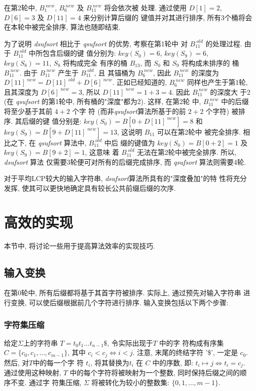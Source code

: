 \documentclass{ws-ijprai}
\begin{document}
在第2轮中, $B_1^{\;new}$, $B_6^{\;new}$ 及 $B_{11}^{\;new}$ 将会依次被
处理. 通过使用 $D[1] = 2$, $D[6] = 3$ 及 $D[11] = 4$ 来分别计算后缀的
键值并对其进行排序, 所有3个桶将会在本轮中被完全排序, 算法也随即结束.

为了说明 \emph{dsufsort} 相比于 \emph{qsufsort} 的优势, 考察在第1轮中
对 $B_{11}^{\;old}$ 的处理过程. 由于 $B_{11}^{\;old}$ 中所包含后缀的键
值分别为: $key(S_0)=6$, $key(S_9)=6$, $key(S_8) = 11$, $S_8$ 将构成完全
有序的桶 $B_{13}$, 而 $S_0$ 和 $S_9$ 将构成未排序的
桶 $B_{11}^{\;new}$. 由于 $B_{11}^{\;new}$ 产生于 $B_{11}^{\;old}$, 且
其锚桶为 $B_6^{\;new}$, 因此 $B_{11}^{\;new}$ 的深度为
$D[11]^{\;new} = D[11]^{\;old} + D[6]^{\;new}$. 正如已经知道的,
$B_6^{\;new}$ 同样也产生于第1轮, 且其深度为 $D[6]^{\;new} =
3$, 所以 $D[11]^{\;new} = 1 + 3 = 4$. 因此 $B_{11}^{\;new}$ 的深度大
于2 (在 \emph{qsufsort} 的第1轮中, 所有桶的"深度"都为2). 这样, 在第2轮
中, $B_{11}^{\;new}$ 中的后缀将至少基于其前 $4+2$ 个字
符 (而非\emph{qsufsort}算法所基于的前 $2+2$ 个字符) 被排序. 其后缀的键
值分别是: $key(S_0)=B[0+D[11] ^{\;new}]=
8$ 和 $key(S_9)=B[9+D[11]^{\;new}]= 13$, 这说明 $B_{11}$ 可以在第2轮中
被完全排序. 相比之下, 在 \emph{qsufsort} 算法中, $B_{11}^{\;old}$ 中后
缀的键值为 $key(S_0) = B[0+2] = 1$ 及 $key(S_9) = B[9+2] = 1$, 这意味
着 $B_{11}^{\;old}$ 无法在第2轮中被完全排序. 所以, \emph{dsufsort} 算法
仅需要3轮便可对所有的后缀完成排序, 而 \emph{qsufsort} 算法则需要4轮.

对于平均LCP较大的输入字符串, \emph{dsufsort}算法所具有的"深度叠加"的特
性将充分发挥, 使其可以更快地确定具有较长公共前缀后缀的次序.


\section{高效的实现}

本节中, 将讨论一些用于提高算法效率的实现技巧.

\subsection{输入变换}

在第0轮中, 所有后缀都将基于其首字符被排序. 实际上, 通过预先对输入字符串
进行变换, 可以使后缀根据前几个字符进行排序. 输入变换包括以下两个步骤:

\subsubsection{字符集压缩}

给定$\Sigma$上的字符串 $T = t_0t_1...t_{n-1}\$$, 令实际出现于$T$ 中的字
符构成有序集 $C = \{c_0, c_1,\dots, c_{m-1}\}$, 其中 $c_i < c_j \iff i
< j$. 注意, 末尾的终结字符 '\$', 一定是 $c_0$. 然后, 对$T$中的每一个字
符 $t_i$, 将其替换为$t_i$ 在 $C$ 中的序数, 即: $t_i \mapsto j \iff t_i
= c_j$. 通过使用这种映射,
$T$ 中的每个字符将被映射为一个整数, 同时保持后缀之间的顺序不变. 通过字
符集压缩, $\Sigma$ 将被转化为较小的整数集: $\{0,1,\dots,m-1\}$.
\end{document}
